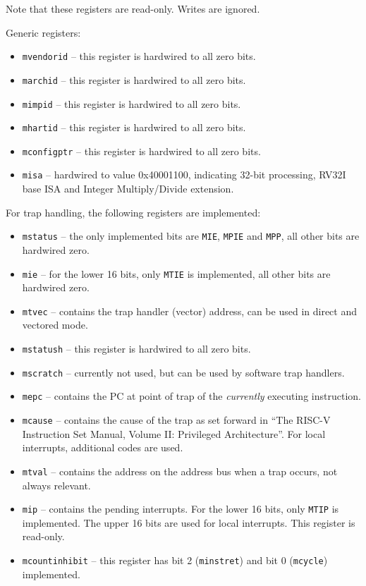 \documentclass[12pt]{article}
\begin{document}
Note that these registers are read-only. Writes are ignored. 

Generic registers:

\begin{itemize}
\item \lstinline|mvendorid| -- this register is hardwired to all zero bits.
\item \lstinline|marchid| -- this register is hardwired to all zero bits.
\item \lstinline|mimpid| -- this register is hardwired to all zero bits.
\item \lstinline|mhartid| -- this register is hardwired to all zero bits.
\item \lstinline|mconfigptr| -- this register is hardwired to all zero bits.
\item \lstinline|misa| -- hardwired to value 0x40001100, indicating 32-bit processing, RV32I base ISA and Integer Multiply/Divide extension.
\end{itemize}

For trap handling, the following registers are implemented:

\begin{itemize}
\item \lstinline|mstatus| -- the only implemented bits are \lstinline|MIE|, \lstinline|MPIE| and \lstinline|MPP|, all other bits are hardwired zero.
\item \lstinline|mie| -- for the lower 16 bits, only \lstinline|MTIE| is implemented, all other bits are hardwired zero.
\item \lstinline|mtvec| -- contains the trap handler (vector) address, can be used in direct and vectored mode.
\item \lstinline|mstatush| -- this register is hardwired to all zero bits.
\item \lstinline|mscratch| -- currently not used, but can be used by software trap handlers.
\item \lstinline|mepc| -- contains the PC at point of trap of the \emph{currently} executing instruction.
\item \lstinline|mcause| -- contains the cause of the trap as set forward in ``The RISC-V Instruction Set Manual, Volume II: Privileged Architecture''. For local interrupts, additional codes are used.
\item \lstinline|mtval| -- contains the address on the address bus when a trap occurs, not always relevant.
\item \lstinline|mip| -- contains the pending interrupts. For the lower 16 bits, only \lstinline|MTIP| is implemented. The upper 16 bits are used for local interrupts. This register is read-only.
\item \lstinline|mcountinhibit| -- this register has bit 2 (\lstinline|minstret|) and bit 0 (\lstinline|mcycle|) implemented.
\end{itemize}
\end{document}
